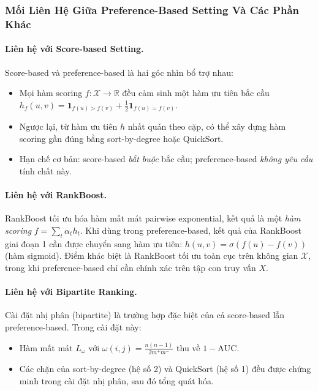 \subsubsection{Mối Liên Hệ Giữa Preference-Based Setting Và Các Phần Khác}

\paragraph{Liên hệ với Score-based Setting.}
Score-based và preference-based là hai góc nhìn bổ trợ nhau:
\begin{itemize}
    \item Mọi hàm scoring $f: \mathcal{X} \to \mathbb{R}$ đều cảm sinh một hàm ưu tiên bắc cầu $h_f(u,v) = \mathbf{1}_{f(u) > f(v)} + \frac{1}{2}\mathbf{1}_{f(u)=f(v)}$.
    \item Ngược lại, từ hàm ưu tiên $h$ nhất quán theo cặp, có thể xây dựng hàm scoring gần đúng bằng sort-by-degree hoặc QuickSort.
    \item Hạn chế cơ bản: score-based \emph{bắt buộc} bắc cầu; preference-based \emph{không yêu cầu} tính chất này.
\end{itemize}

\paragraph{Liên hệ với RankBoost.}
RankBoost tối ưu hóa hàm mất mát pairwise exponential, kết quả là một \emph{hàm scoring} $f = \sum_t \alpha_t h_t$. Khi dùng trong preference-based, kết quả của RankBoost giai đoạn 1 cần được chuyển sang hàm ưu tiên: $h(u,v) = \sigma(f(u) - f(v))$ (hàm sigmoid). Điểm khác biệt là RankBoost tối ưu toàn cục trên không gian $\mathcal{X}$, trong khi preference-based chỉ cần chính xác trên tập con truy vấn $X$.

\paragraph{Liên hệ với Bipartite Ranking.}
Cài đặt nhị phân (bipartite) là trường hợp đặc biệt của cả score-based lẫn preference-based. Trong cài đặt này:
\begin{itemize}
    \item Hàm mất mát $L_\omega$ với $\omega(i,j) = \frac{n(n-1)}{2m^+m^-}$ thu về $1 - \mathrm{AUC}$.
    \item Các chặn của sort-by-degree (hệ số 2) và QuickSort (hệ số 1) đều được chứng minh trong cài đặt nhị phân, sau đó tổng quát hóa.
\end{itemize}

